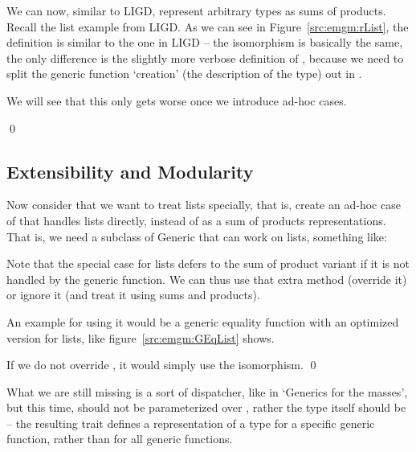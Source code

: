 \begin{example}
We can now, similar to  LIGD, represent arbitrary types as sums of products.
Recall the list example from LIGD.
As we can see in Figure~\ref{src:emgm:rList}, the definition is similar to
the one in LIGD
-- the isomorphism is basically the same, the only difference is the slightly
more verbose definition of , because we need to split the generic
function `creation' (the description of the type) out in .

We will see that this only gets worse once we introduce ad-hoc cases.

\qed{}
\end{example}

\subsection{Extensibility and Modularity}
Now consider that we want to treat lists specially, that is, create an
ad-hoc case of  that handles lists directly, instead of as a
sum of products representations. That is, we need a subclass of Generic
that can work on lists, something like:

Note that the special case for lists defers to the sum of product variant
if it is not handled by the generic function. We can thus use that extra
method (override it) or ignore it (and treat it using sums and products).

\begin{example}
An example for using it would be a generic equality function with an optimized
version for lists, like figure~\ref{src:emgm:GEqList} shows.

If we do not override , it would simply use the isomorphism. \qed
\end{example}

What we are still missing is a sort of dispatcher, like  in `Generics
for the masses', but this time,  should not be parameterized over ,
rather the type itself should be -- the resulting  trait defines a
representation of a type for a specific generic function, rather than for all
generic functions.


